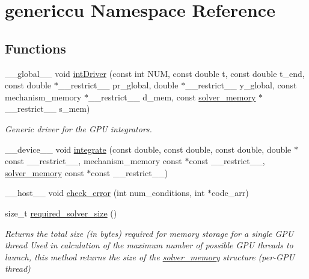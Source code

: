 \hypertarget{namespacegenericcu}{}\section{genericcu Namespace Reference}
\label{namespacegenericcu}
\subsection*{Functions}
\begin{DoxyCompactItemize}
\item 
\+\_\+\+\_\+global\+\_\+\+\_\+ void \hyperlink{namespacegenericcu_aff46876594be0dced04cee0173535519}{int\+Driver} (const int N\+UM, const double t, const double t\+\_\+end, const double $\ast$\+\_\+\+\_\+restrict\+\_\+\+\_\+ pr\+\_\+global, double $\ast$\+\_\+\+\_\+restrict\+\_\+\+\_\+ y\+\_\+global, const mechanism\+\_\+memory $\ast$\+\_\+\+\_\+restrict\+\_\+\+\_\+ d\+\_\+mem, const \hyperlink{structsolver__memory}{solver\+\_\+memory} $\ast$\+\_\+\+\_\+restrict\+\_\+\+\_\+ s\+\_\+mem)
\begin{DoxyCompactList}\small\item\em Generic driver for the G\+PU integrators. \end{DoxyCompactList}\item 
\+\_\+\+\_\+device\+\_\+\+\_\+ void \hyperlink{namespacegenericcu_ac62c1a51172ab7750c2f75688ca8e486}{integrate} (const double, const double, const double, double $\ast$const \+\_\+\+\_\+restrict\+\_\+\+\_\+, mechanism\+\_\+memory const $\ast$const \+\_\+\+\_\+restrict\+\_\+\+\_\+, \hyperlink{structsolver__memory}{solver\+\_\+memory} const $\ast$const \+\_\+\+\_\+restrict\+\_\+\+\_\+)
\item 
\+\_\+\+\_\+host\+\_\+\+\_\+ void \hyperlink{namespacegenericcu_af403dabfc12de79ff9ab8575983d6f83}{check\+\_\+error} (int num\+\_\+conditions, int $\ast$code\+\_\+arr)
\item 
size\+\_\+t \hyperlink{namespacegenericcu_a95e70ae54ccfc5eb00792846ca80ecde}{required\+\_\+solver\+\_\+size} ()
\begin{DoxyCompactList}\small\item\em Returns the total size (in bytes) required for memory storage for a single G\+PU thread Used in calculation of the maximum number of possible G\+PU threads to launch, this method returns the size of the \hyperlink{structsolver__memory}{solver\+\_\+memory} structure (per-\/\+G\+PU thread) \end{DoxyCompactList}\item 

\end{DoxyCompactItemize}

